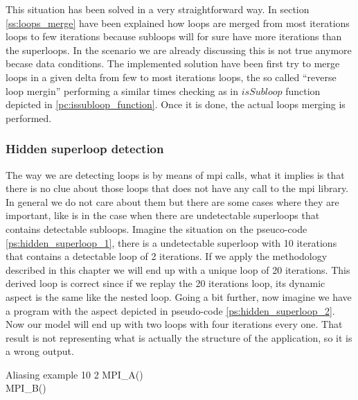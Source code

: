 This situation has been solved in a very straightforward way. In section
\ref{ss:loops_merge} have been explained how loops are merged from most
iterations loops to few iterations because subloops will for sure have more
iterations than the superloops. In the scenario we are already discussing this
is not true anymore becase data conditions. The implemented solution have been
first try to merge loops in a given delta from few to most iterations loops, the
so called ``reverse loop mergin'' performing a similar times checking as in 
$isSubloop$ function depicted in \ref{pc:issubloop_function}. Once it is done,
the actual loops merging is performed.

\subsubsection{Hidden superloop detection}\label{ss:hidden_superloop_det}

The way we are detecting loops is by means of mpi calls, what it implies is that
there is no clue about those loops that does not have any call to the mpi
library. In general we do not care about them but there are some cases where
they are important, like is in the case when there are undetectable superloops
that contains detectable subloops. Imagine the situation on the pseuco-code
\ref{ps:hidden_superloop_1}, there is a undetectable superloop with 10 iterations 
that contains a detectable loop of 2 iterations. If we apply the methodology
described in this chapter we will end up with a unique loop of 20 iterations.
This derived loop is correct since if we replay the 20 iterations loop, its
dynamic aspect is the same like the nested loop. Going a bit further, now
imagine we have a program with the aspect depicted in pseudo-code
\ref{ps:hidden_superloop_2}. Now our model will end up with two loops with four
iterations every one. That result is not representing what is actually the
structure of the application, so it is a wrong output.

\begin{pseudocode}{Aliasing example}{ }
    \label{ps:hidden_superloop_1}
      10 \DO
    \BEGIN
          2 \DO
        \BEGIN
            MPI\_A() \\
            MPI\_B() \\
        \END \\
    \END \\
\end{pseudocode}

